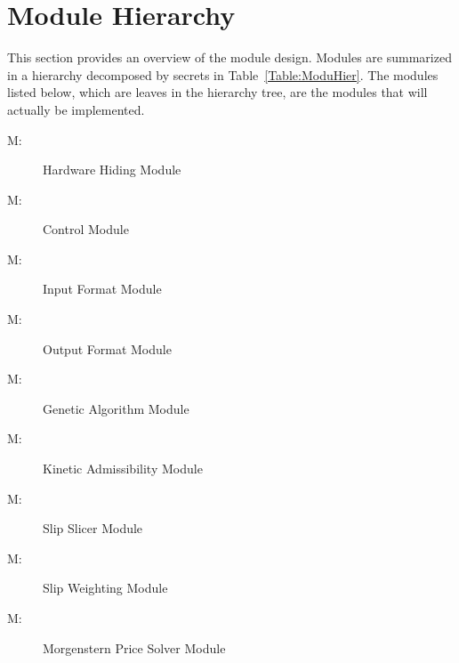 \documentclass[12pt]{article}
\newcounter{modnum}
\newcommand{\mthemodnum}{M\themodnum}
\begin{document}
\section{Module Hierarchy}
\label{Sec:ModuHier}
This section provides an overview of the module design. Modules are summarized in a hierarchy decomposed by secrets in Table~\ref{Table:ModuHier}. The modules listed below, which are leaves in the hierarchy tree, are the modules that will actually be implemented.
\begin{description}
\item[\mthemodnum\label{MhwHiding}:]Hardware Hiding Module
\end{description}
\begin{description}
\item[\mthemodnum\label{MmodControl}:]Control Module
\end{description}
\begin{description}
\item[\mthemodnum\label{Mmodinputfdesc}:]Input Format Module
\end{description}
\begin{description}
\item[\mthemodnum\label{Mmodoutputfdesc}:]Output Format Module
\end{description}
\begin{description}
\item[\mthemodnum\label{Mmodgenalgdesc}:]Genetic Algorithm Module
\end{description}
\begin{description}
\item[\mthemodnum\label{Mmodkinadmdesc}:]Kinetic Admissibility Module
\end{description}
\begin{description}
\item[\mthemodnum\label{Mmodslipslicerdesc}:]Slip Slicer Module
\end{description}
\begin{description}
\item[\mthemodnum\label{Mmodslipweightdesc}:]Slip Weighting Module
\end{description}
\begin{description}
\item[\mthemodnum\label{Mmodmpdesc}:]Morgenstern Price Solver Module
\end{description}
\end{document}
